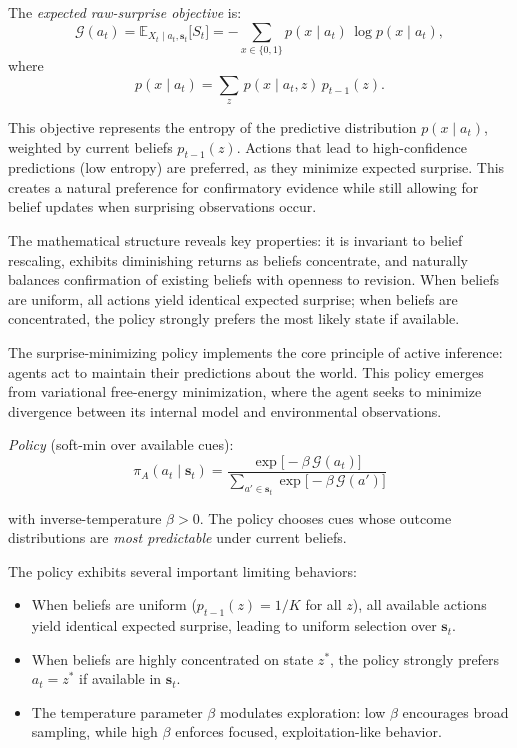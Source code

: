 \documentclass{article}
\begin{document}
The \textit{expected raw-surprise objective} is:
\begin{equation}
\mathcal G(a_t)=\mathbb E_{X_t\mid a_t,\mathbf s_t}\bigl[S_t\bigr] =-\sum_{x\in\{0,1\}}\!p(x\mid a_t)\,\log p(x\mid a_t),
\end{equation}
where
\begin{equation}
p(x\mid a_t)=\sum_{z}\,p(x\mid a_t,z)\,p_{t-1}(z).
\end{equation}

This objective represents the entropy of the predictive distribution $p(x\mid a_t)$, weighted by current beliefs $p_{t-1}(z)$. Actions that lead to high-confidence predictions (low entropy) are preferred, as they minimize expected surprise. This creates a natural preference for confirmatory evidence while still allowing for belief updates when surprising observations occur.

The mathematical structure reveals key properties: it is invariant to belief rescaling, exhibits diminishing returns as beliefs concentrate, and naturally balances confirmation of existing beliefs with openness to revision. When beliefs are uniform, all actions yield identical expected surprise; when beliefs are concentrated, the policy strongly prefers the most likely state if available.


The surprise-minimizing policy implements the core principle of active inference: agents act to maintain their predictions about the world. This policy emerges from variational free-energy minimization, where the agent seeks to minimize divergence between its internal model and environmental observations.

\textit{Policy} (soft-min over available cues):
\begin{equation}
\pi_A(a_t\mid \mathbf s_t) =\frac{\exp\bigl[-\beta\,\mathcal G(a_t)\bigr]} {\sum_{a'\in\mathbf s_t}\exp\bigl[-\beta\,\mathcal G(a')\bigr]} \tag{A‐1}
\end{equation}

with inverse-temperature $\beta>0$. The policy chooses cues whose outcome distributions are \textit{most predictable} under current beliefs.

The policy exhibits several important limiting behaviors:
\begin{itemize}
\item When beliefs are uniform ($p_{t-1}(z) = 1/K$ for all $z$), all available actions yield identical expected surprise, leading to uniform selection over $\mathbf s_t$.
\item When beliefs are highly concentrated on state $z^*$, the policy strongly prefers $a_t = z^*$ if available in $\mathbf s_t$.
\item The temperature parameter $\beta$ modulates exploration: low $\beta$ encourages broad sampling, while high $\beta$ enforces focused, exploitation-like behavior.
\end{itemize}
\end{document}
